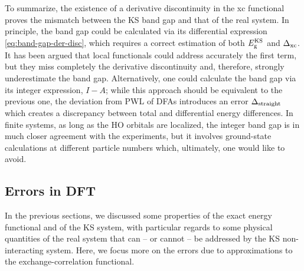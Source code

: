 To summarize, the existence of a derivative discontinuity in the xc functional proves the mismatch between the KS band gap and that of the real system. In principle, the band gap could be calculated via its differential expression \eqref{eq:band-gap-der-disc}, which requires a correct estimation of both $E_{\rm g}^{\rm KS}$ and $\Delta_{\rm xc}$. It has been argued that local functionals could address accurately the first term, but they miss completely the derivative discontinuity and, therefore, strongly underestimate the band gap. Alternatively, one could calculate the band gap via its integer expression, $I-A$; while this approach should be equivalent to the previous one, the deviation from PWL of DFAs introduces an error $\Delta_{\rm straight}$ which creates a discrepancy between total and differential energy differences. In finite systems, as long as the HO orbitals are localized, the integer band gap is in much closer agreement with the experiments, but it involves ground-state calculations at different particle numbers which, ultimately, one would like to avoid.

\subsection{Errors in DFT\label{sec:errors-dft}}
In the previous sections, we discussed some properties of the exact energy functional and of the KS system, with particular regards to some physical quantities of the real system that can -- or cannot -- be addressed by the KS non-interacting system. Here, we focus more on the errors due to approximations to the exchange-correlation functional.

